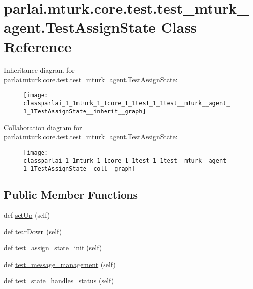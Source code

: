 \hypertarget{classparlai_1_1mturk_1_1core_1_1test_1_1test__mturk__agent_1_1TestAssignState}{}\section{parlai.\+mturk.\+core.\+test.\+test\+\_\+mturk\+\_\+agent.\+Test\+Assign\+State Class Reference}
\label{classparlai_1_1mturk_1_1core_1_1test_1_1test__mturk__agent_1_1TestAssignState}


Inheritance diagram for parlai.\+mturk.\+core.\+test.\+test\+\_\+mturk\+\_\+agent.\+Test\+Assign\+State\+:
\nopagebreak
\begin{figure}[H]
\begin{center}
\leavevmode
\texttt{[image: classparlai\_1\_1mturk\_1\_1core\_1\_1test\_1\_1test\_\_mturk\_\_agent\_1\_1TestAssignState\_\_inherit\_\_graph]}
\end{center}
\end{figure}


Collaboration diagram for parlai.\+mturk.\+core.\+test.\+test\+\_\+mturk\+\_\+agent.\+Test\+Assign\+State\+:
\nopagebreak
\begin{figure}[H]
\begin{center}
\leavevmode
\texttt{[image: classparlai\_1\_1mturk\_1\_1core\_1\_1test\_1\_1test\_\_mturk\_\_agent\_1\_1TestAssignState\_\_coll\_\_graph]}
\end{center}
\end{figure}
\subsection*{Public Member Functions}
\begin{DoxyCompactItemize}
\item 
def \hyperlink{classparlai_1_1mturk_1_1core_1_1test_1_1test__mturk__agent_1_1TestAssignState_ab007ae6652285eb12ea8868a962e3c24}{set\+Up} (self)
\item 
def \hyperlink{classparlai_1_1mturk_1_1core_1_1test_1_1test__mturk__agent_1_1TestAssignState_aa09fcbe7ae3c90559b032d3fdd79969e}{tear\+Down} (self)
\item 
def \hyperlink{classparlai_1_1mturk_1_1core_1_1test_1_1test__mturk__agent_1_1TestAssignState_af5803e89246df5c970afae9e01835e8a}{test\+\_\+assign\+\_\+state\+\_\+init} (self)
\item 
def \hyperlink{classparlai_1_1mturk_1_1core_1_1test_1_1test__mturk__agent_1_1TestAssignState_a4b7c9591e63e98797816e9a17599c706}{test\+\_\+message\+\_\+management} (self)
\item 
def \hyperlink{classparlai_1_1mturk_1_1core_1_1test_1_1test__mturk__agent_1_1TestAssignState_a1fdcb1c28571335a629b2a8bdb1762bc}{test\+\_\+state\+\_\+handles\+\_\+status} (self)
\end{DoxyCompactItemize}

